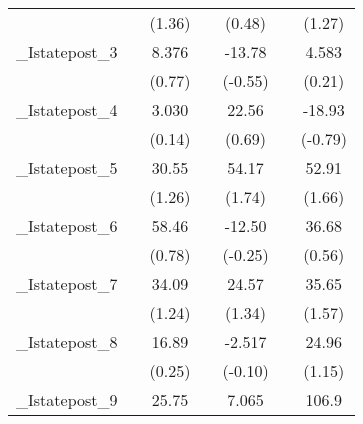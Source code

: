 {\begin{tabular}{l*{6}{c}}
            &                     &      (1.36)         &                     &      (0.48)         &                     &      (1.27)         \\
[1em]
\_Istatepost\_3&                     &       8.376         &                     &      -13.78         &                     &       4.583         \\
            &                     &      (0.77)         &                     &     (-0.55)         &                     &      (0.21)         \\
[1em]
\_Istatepost\_4&                     &       3.030         &                     &       22.56         &                     &      -18.93         \\
            &                     &      (0.14)         &                     &      (0.69)         &                     &     (-0.79)         \\
[1em]
\_Istatepost\_5&                     &       30.55         &                     &       54.17         &                     &       52.91         \\
            &                     &      (1.26)         &                     &      (1.74)         &                     &      (1.66)         \\
[1em]
\_Istatepost\_6&                     &       58.46         &                     &      -12.50         &                     &       36.68         \\
            &                     &      (0.78)         &                     &     (-0.25)         &                     &      (0.56)         \\
[1em]
\_Istatepost\_7&                     &       34.09         &                     &       24.57         &                     &       35.65         \\
            &                     &      (1.24)         &                     &      (1.34)         &                     &      (1.57)         \\
[1em]
\_Istatepost\_8&                     &       16.89         &                     &      -2.517         &                     &       24.96         \\
            &                     &      (0.25)         &                     &     (-0.10)         &                     &      (1.15)         \\
[1em]
\_Istatepost\_9&                     &       25.75         &                     &       7.065         &                     &       106.9\sym{*}  \\

\end{tabular}}
